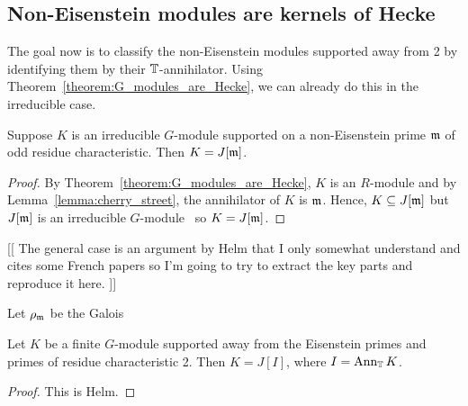 \documentclass{article}
\begin{document}
\subsection{Non-Eisenstein modules are kernels of Hecke}%
\label{sub:non_eisenstein_modules_are_kernels_of_hecke}

The goal now is to classify the non-Eisenstein modules supported away from 2 by
identifying them by their $\mathbb{T}$-annihilator. Using
Theorem~\ref{theorem:G_modules_are_Hecke}, we can already do this in the
irreducible case.
\begin{corollary}
    Suppose $K$ is an irreducible $G$-module supported on a non-Eisenstein
    prime $\mathfrak{m}$ of odd residue characteristic. Then $K=J[\mathfrak{m}]$.
\end{corollary}
\begin{proof}
    By Theorem~\ref{theorem:G_modules_are_Hecke}, $K$ is an $R$-module and by
    Lemma~\ref{lemma:cherry_street}, the annihilator of $K$ is $\mathfrak{m}$. Hence,
    $K\subseteq J[\mathfrak{m}]$ but $J[\mathfrak{m}]$ is an irreducible
    $G$-module~\cite[Proposition 14.2]{mazur:eisenstein} so $K=J[\mathfrak{m}]$.
\end{proof}

[[
The general case is an argument by Helm that I only somewhat understand and
cites some French papers so I'm going to try to extract the key parts and
reproduce it here.
]]

Let $\rho_{\mathfrak{m}}$ be the Galois 
\begin{theorem}\label{theorem:non_eisenstein_kernel_hecke}
    Let $K$ be a finite $G$-module supported away from the Eisenstein primes
    and primes of residue characteristic 2. Then $K=J[I]$, where $I=\operatorname{Ann}_{\mathbb{T}}
    K$.
\end{theorem}
\begin{proof}
    This is Helm.    
\end{proof}



\end{document}
